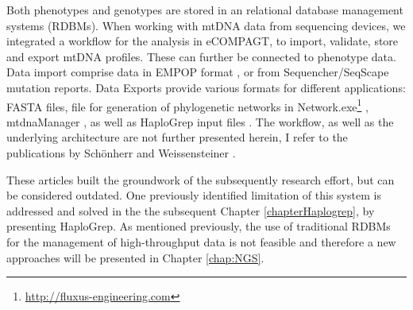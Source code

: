Both phenotypes and genotypes are stored in an relational database management systems (RDBMs). When working with mtDNA data from sequencing devices, we integrated a workflow for the analysis in eCOMPAGT, to import, validate, store and export mtDNA profiles. These can further be connected to phenotype data. Data import comprise data in EMPOP format \cite{Parson2007}, or from Sequencher/SeqScape mutation reports. Data Exports provide various formats for different applications: FASTA files, file for generation of phylogenetic networks in Network.exe\footnote{\url{http://fluxus-engineering.com}}  \cite{Bandelt1999}, mtdnaManager \cite{Lee2008}, as well as HaploGrep input files \cite{Kloss-Brandstatter2011,Weissensteiner2016a}. The workflow, as well as the underlying architecture are not further presented herein, I refer to the publications by Sch\"onherr and Weissensteiner \cite{Schoenherr2009,Weissensteiner2010}.

These articles built the groundwork of the subsequently research effort, but can be considered outdated. One previously identified limitation of this system is addressed and solved in the the subsequent Chapter \ref{chapterHaplogrep}, by presenting HaploGrep. As mentioned previously, the use of traditional RDBMs for the management of high-throughput data is not feasible and therefore a new approaches will be presented in Chapter \ref{chap:NGS}. 


